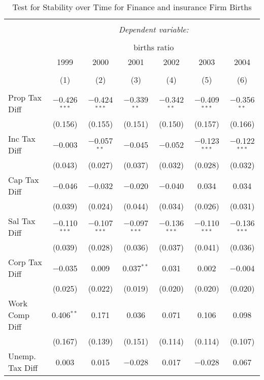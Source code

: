 
\begin{table}[!htbp] \centering 
  \caption{Test for Stability over Time for  Finance and insurance Firm Births} 
  \label{52year} 
\small 
\begin{tabular}{@{\extracolsep{5pt}}lcccccc} 
\\[-1.8ex]\hline 
\hline \\[-1.8ex] 
 & \multicolumn{6}{c}{\textit{Dependent variable:}} \\ 
\cline{2-7} 
\\[-1.8ex] & \multicolumn{6}{c}{births ratio} \\ 
 & 1999 & 2000 & 2001 & 2002 & 2003 & 2004 \\ 
\\[-1.8ex] & (1) & (2) & (3) & (4) & (5) & (6)\\ 
\hline \\[-1.8ex] 
 Prop Tax Diff & $-$0.426$^{***}$ & $-$0.424$^{***}$ & $-$0.339$^{**}$ & $-$0.342$^{**}$ & $-$0.409$^{***}$ & $-$0.356$^{**}$ \\ 
  & (0.156) & (0.155) & (0.151) & (0.150) & (0.157) & (0.166) \\ 
  Inc Tax Diff & $-$0.003 & $-$0.057$^{**}$ & $-$0.045 & $-$0.052 & $-$0.123$^{***}$ & $-$0.122$^{***}$ \\ 
  & (0.043) & (0.027) & (0.037) & (0.032) & (0.028) & (0.032) \\ 
  Cap Tax Diff & $-$0.046 & $-$0.032 & $-$0.020 & $-$0.040 & 0.034 & 0.034 \\ 
  & (0.039) & (0.024) & (0.044) & (0.034) & (0.026) & (0.031) \\ 
  Sal Tax Diff & $-$0.110$^{***}$ & $-$0.107$^{***}$ & $-$0.097$^{***}$ & $-$0.136$^{***}$ & $-$0.110$^{***}$ & $-$0.136$^{***}$ \\ 
  & (0.039) & (0.028) & (0.036) & (0.037) & (0.041) & (0.036) \\ 
  Corp Tax Diff & $-$0.035 & 0.009 & 0.037$^{**}$ & 0.031 & 0.002 & $-$0.004 \\ 
  & (0.025) & (0.022) & (0.019) & (0.020) & (0.020) & (0.020) \\ 
  Work Comp Diff & 0.406$^{**}$ & 0.171 & 0.036 & 0.071 & 0.106 & 0.098 \\ 
  & (0.167) & (0.139) & (0.151) & (0.114) & (0.114) & (0.107) \\ 
  Unemp. Tax Diff & 0.003 & 0.015 & $-$0.028 & 0.017 & $-$0.028 & 0.067 \\ 

\end{tabular}
\end{table}
